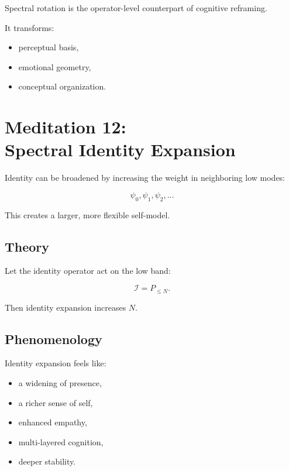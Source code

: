 \documentclass[12pt]{article}
\begin{document}
Spectral rotation is the operator-level counterpart of cognitive reframing.

It transforms:

\begin{itemize}
    \item perceptual basis,
    \item emotional geometry,
    \item conceptual organization.
\end{itemize}

\newpage

\chapter{Meditation 12:\\ Spectral Identity Expansion}

Identity can be broadened by increasing the weight in neighboring low modes:

\[
\psi_0,\psi_1,\psi_2,\dots
\]

This creates a larger, more flexible self-model.

\section{Theory}

Let the identity operator act on the low band:

\[
\mathcal{I} = P_{\le N}.
\]

Then identity expansion increases $N$.

\section{Phenomenology}

Identity expansion feels like:

\begin{itemize}
    \item a widening of presence,
    \item a richer sense of self,
    \item enhanced empathy,
    \item multi-layered cognition,
    \item deeper stability.
\end{itemize}
\end{document}
